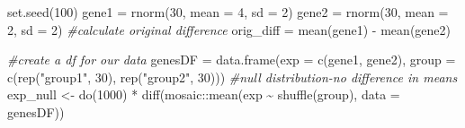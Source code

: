 \documentclass[
]{article}
\newenvironment{Shaded}{\begin{snugshade}}{\end{snugshade}}
\newcommand{\AttributeTok}[1]{\textcolor[rgb]{0.77,0.63,0.00}{#1}}
\newcommand{\CommentTok}[1]{\textcolor[rgb]{0.56,0.35,0.01}{\textit{#1}}}
\newcommand{\DecValTok}[1]{\textcolor[rgb]{0.00,0.00,0.81}{#1}}
\newcommand{\FunctionTok}[1]{\textcolor[rgb]{0.00,0.00,0.00}{#1}}
\newcommand{\NormalTok}[1]{#1}
\newcommand{\OtherTok}[1]{\textcolor[rgb]{0.56,0.35,0.01}{#1}}
\newcommand{\SpecialCharTok}[1]{\textcolor[rgb]{0.00,0.00,0.00}{#1}}
\newcommand{\StringTok}[1]{\textcolor[rgb]{0.31,0.60,0.02}{#1}}
\begin{document}
\begin{Shaded}
\begin{Highlighting}[]
\FunctionTok{set.seed}\NormalTok{(}\DecValTok{100}\NormalTok{)}
\NormalTok{gene1 }\OtherTok{=} \FunctionTok{rnorm}\NormalTok{(}\DecValTok{30}\NormalTok{, }\AttributeTok{mean =} \DecValTok{4}\NormalTok{, }\AttributeTok{sd =} \DecValTok{2}\NormalTok{)}
\NormalTok{gene2 }\OtherTok{=} \FunctionTok{rnorm}\NormalTok{(}\DecValTok{30}\NormalTok{, }\AttributeTok{mean =} \DecValTok{2}\NormalTok{, }\AttributeTok{sd =} \DecValTok{2}\NormalTok{)}
\CommentTok{\#calculate original difference}
\NormalTok{orig\_diff }\OtherTok{=} \FunctionTok{mean}\NormalTok{(gene1) }\SpecialCharTok{{-}} \FunctionTok{mean}\NormalTok{(gene2)}


\CommentTok{\#create a df for our data}
\NormalTok{genesDF }\OtherTok{=} \FunctionTok{data.frame}\NormalTok{(}\AttributeTok{exp =} \FunctionTok{c}\NormalTok{(gene1, gene2), }\AttributeTok{group =} \FunctionTok{c}\NormalTok{(}\FunctionTok{rep}\NormalTok{(}\StringTok{"group1"}\NormalTok{, }\DecValTok{30}\NormalTok{), }\FunctionTok{rep}\NormalTok{(}\StringTok{"group2"}\NormalTok{, }\DecValTok{30}\NormalTok{)))}
\CommentTok{\#null distribution{-}no difference in means }
\NormalTok{exp\_null }\OtherTok{\textless{}{-}} \FunctionTok{do}\NormalTok{(}\DecValTok{1000}\NormalTok{) }\SpecialCharTok{*} \FunctionTok{diff}\NormalTok{(mosaic}\SpecialCharTok{::}\FunctionTok{mean}\NormalTok{(exp }\SpecialCharTok{\textasciitilde{}} \FunctionTok{shuffle}\NormalTok{(group), }\AttributeTok{data =}\NormalTok{ genesDF))}


\end{Highlighting}
\end{Shaded}
\end{document}
